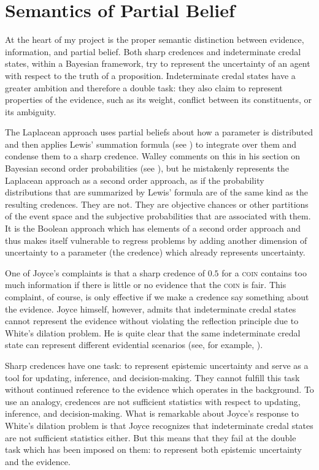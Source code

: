 \section{Semantics of Partial Belief}
\label{SemanticsOfPartialBelief}

At the heart of my project is the proper semantic
distinction between evidence, information, and partial
belief. Both sharp credences and indeterminate credal
states, within a Bayesian framework, try to represent
the uncertainty of an agent with respect to the truth
of a proposition. Indeterminate credal states have a
greater ambition and therefore a double task: they also
claim to represent properties of the evidence, such as
its weight, conflict between its constituents, or its
ambiguity.

The Laplacean approach uses partial beliefs about how a
parameter is distributed and then applies Lewis'
summation formula (see ) to
integrate over them and condense them to a sharp
credence. Walley comments on this  in
his section on Bayesian second order probabilities (see
), but he mistakenly
represents the Laplacean approach as a second order
approach, as if the probability distributions that are
summarized by Lewis' formula are of the same kind as
the resulting credences. They are not. They are
objective chances or other partitions of the event
space and the subjective probabilities that are
associated with them. It is the Boolean approach which
has elements of a second order approach and thus makes
itself vulnerable to regress problems by adding another
dimension of uncertainty to a parameter (the credence)
which already represents uncertainty.

One of Joyce's complaints is that a sharp credence of
$0.5$ for a \textsc{coin} contains too much information
if there is little or no evidence that the
\textsc{coin} is fair. This complaint, of course, is
only effective if we make a credence say something
about the evidence. Joyce himself, however, admits that
indeterminate credal states cannot represent the
evidence without violating the reflection principle due
to White's dilation problem. He is quite clear that the
same indeterminate credal state can represent different
evidential scenarios (see, for example,
).

Sharp credences have one task: to represent epistemic
uncertainty and serve as a tool for updating,
inference, and decision-making. They cannot fulfill
this task without continued reference to the evidence
which operates in the background. To use an analogy,
credences are not sufficient statistics with respect to
updating, inference, and decision-making. What is
remarkable about Joyce's response to White's dilation
problem is that Joyce recognizes that indeterminate
credal states are not sufficient statistics either. But
this means that they fail at the double task which has
been imposed on them: to represent both epistemic
uncertainty and the evidence.

